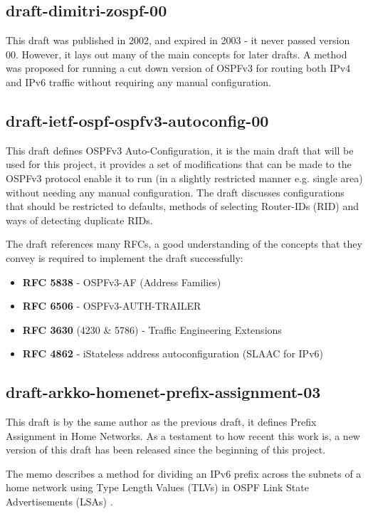 \documentclass[12pt]{report}
\begin{document}
\subsection{draft-dimitri-zospf-00}
This draft was published in 2002, and expired in 2003 - it never passed version
00\cite{draft-dimitri-zospf-00}.  However, it lays out many of the main concepts for later drafts. A method
was proposed for running a cut down version of OSPFv3 for routing both IPv4 and
IPv6 traffic without requiring any manual configuration. 

\subsection{draft-ietf-ospf-ospfv3-autoconfig-00} 
This draft defines OSPFv3
Auto-Configuration\cite{draft-ietf-ospf-ospfv3-autoconfig-00}, it is the main
draft that will be used for this project, it provides a set of modifications
that can be made to the OSPFv3 protocol enable it to run (in a slightly
restricted manner e.g. single area) without needing any manual configuration.
The draft discusses configurations that should be restricted to defaults,
methods of selecting Router-IDs (RID)  and ways of
detecting duplicate RIDs. 

The draft references many RFCs, a good understanding of the concepts 
that they convey is required to implement the draft successfully:

\begin{itemize}
	\item {\bf RFC 5838} - OSPFv3-AF (Address Families)
	\item {\bf RFC 6506} - OSPFv3-AUTH-TRAILER
	\item {\bf RFC 3630} (4230 \& 5786) - Traffic Engineering Extensions 
	\item {\bf RFC 4862} - iStateless address autoconfiguration (SLAAC for IPv6) 
\end{itemize}

\subsection{draft-arkko-homenet-prefix-assignment-03}
This draft is by the same author as the previous draft, it defines Prefix
Assignment in Home Networks\cite{draft-arkko-homenet-prefix-assignment-03}. As a
testament to how recent this work is, a new version of this draft has been
released since the beginning of this project. 

The memo describes a method for dividing an IPv6 prefix across the subnets of a
home network using Type Length Values (TLVs)   in OSPF Link State Advertisements (LSAs) .
\end{document}
